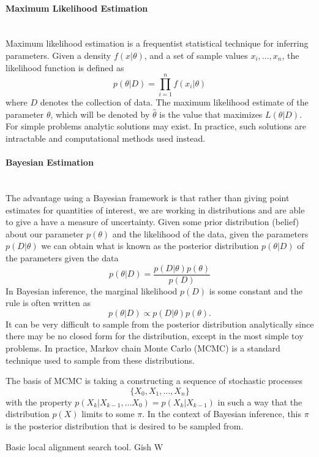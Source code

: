 \paragraph{Maximum Likelihood Estimation} ~\\
\noindent Maximum likelihood estimation is a frequentist statistical technique for inferring parameters. Given a density $f(x|\theta)$, and a set of sample values $x_i,\ldots,x_n$, the likelihood function is defined as  
	\begin{equation}
		p(\theta|D) = \prod_{i=1}^{n}f(x_i|\theta)
	\end{equation}
where $D$ denotes the collection of data. The maximum likelihood estimate of the parameter $\theta$, which will be denoted by $\hat{\theta}$ is the value that maximizes $L(\theta|D)$. For simple problems analytic solutions may exist. In practice, such solutions are intractable and computational methods used instead.

\paragraph{Bayesian Estimation}~\\
\noindent The advantage using a Bayesian framework is that rather than giving point estimates for quantities of interest, we are working in distributions and are able to give a have a measure of uncertainty. Given some prior distribution (belief) about our parameter $p(\theta)$ and the likelihood of the data, given the parameters $p(D|\theta)$ we can obtain what is known as the posterior distribution $ p(\theta|D)$ of the parameters given the data 
    \begin{equation}
        p(\theta|D) = \frac{p(D|\theta)p(\theta)}{p(D)}
    \end{equation}
In Bayesian inference, the marginal likelihood $p(D)$ is some constant and the rule is often written as 
    \begin{equation}
        p(\theta|D) \propto p(D|\theta)p(\theta).
    \end{equation}
It can be very difficult to sample from the posterior distribution analytically since there may be no closed form for the distribution, except in the most simple toy problems. In practice, Markov chain Monte Carlo (MCMC) is a standard technique used to sample from these distributions. 

The basis of MCMC is taking a constructing a sequence of stochastic processes $$\{X_0,X_1,\ldots,X_n\}$$ with the property $p(X_k|X_{k-1},\ldots X_0) = p(X_k|X_{k-1})$ in such a way that the distribution $p(X)$ limits to some $\pi$. In the context of Bayesian inference, this $\pi$ is the posterior distribution that is desired to be sampled from.

Basic local alignment search tool.
Gish W